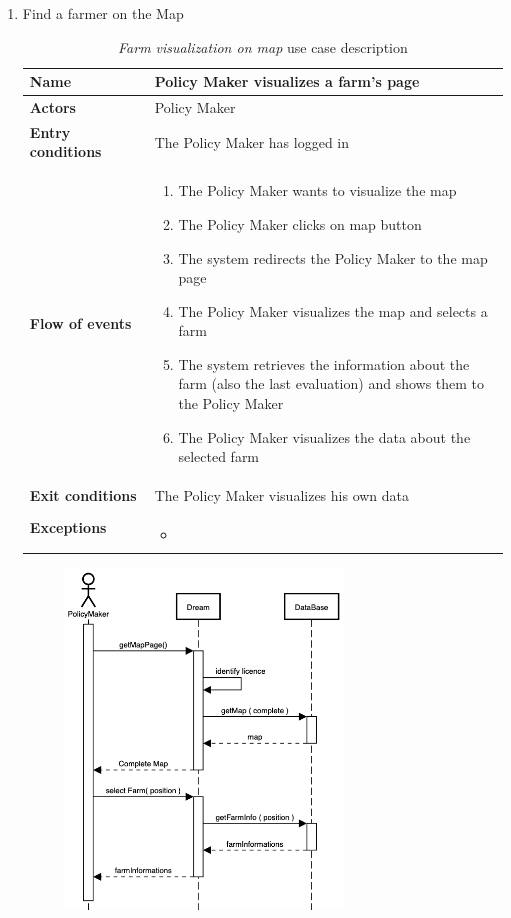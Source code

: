 \begin{enumerate}
    \item Find a farmer on the Map
    \begin{longtable}{p{0.26\linewidth}p{0.75\linewidth}}
        \toprule
        \textbf{Name} & \textbf{Policy Maker visualizes a farm’s page} \\
        \midrule
        \textbf{Actors} & Policy Maker \\
        \midrule
        \textbf{Entry conditions} & The Policy Maker has logged in\\
        \midrule
        \textbf{Flow of events} & 
        \begin{enumerate}
            \item The Policy Maker wants to visualize the map
            \item The Policy Maker clicks on map button
            \item The system redirects the Policy Maker to the map page
            \item The Policy Maker visualizes the map and selects a farm
            \item The system retrieves the information about the farm (also the last evaluation) and shows them to the Policy Maker
            \item The Policy Maker visualizes the data about the selected farm
        \end{enumerate} \\
        \midrule
        \textbf{Exit conditions} & The Policy Maker visualizes his own data\\
        \midrule
        \textbf{Exceptions} & 
        \begin{itemize}
            \item 
        \end{itemize}\\
        \bottomrule
        \caption{\emph{Farm visualization on map} use case description}
    \end{longtable}
    \begin{figure}[H]
        \begin{center}
        \includegraphics[width=0.7\textwidth]{sequence/searchOnMap.png}

\end{center}
\end{figure}
\end{enumerate}
